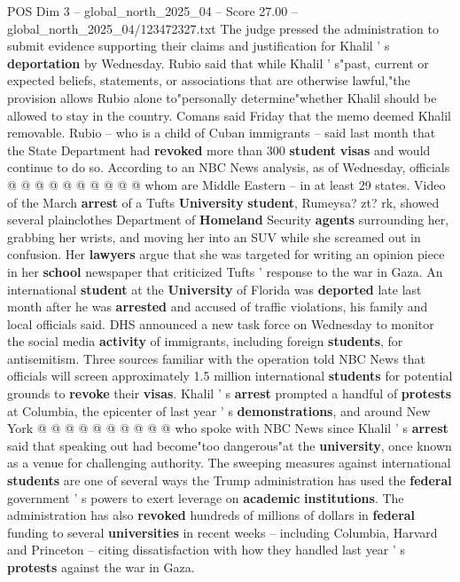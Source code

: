 \begin{textsample}{POS Dim 3 – global\_north\_2025\_04 – Score 27.00 – global\_north\_2025\_04/123472327.txt}
The judge pressed the administration to submit evidence supporting their claims and justification for Khalil ' s \textbf{deportation} by Wednesday.
Rubio said that while Khalil ' s"past, current or expected beliefs, statements, or associations that are otherwise lawful,"the provision allows Rubio alone to"personally determine"whether Khalil should be allowed to stay in the country.
Comans said Friday that the memo deemed Khalil removable.
Rubio -- who is a child of Cuban immigrants -- said last month that the State Department had \textbf{revoked} more than 300 \textbf{student} \textbf{visas} and would continue to do so.
According to an NBC News analysis, as of Wednesday, officials @ @ @ @ @ @ @ @ @ @ whom are Middle Eastern -- in at least 29 states.
Video of the March \textbf{arrest} of a Tufts \textbf{University} \textbf{student}, Rumeysa? zt? rk, showed several plainclothes Department of \textbf{Homeland} Security \textbf{agents} surrounding her, grabbing her wrists, and moving her into an SUV while she screamed out in confusion.
Her \textbf{lawyers} argue that she was targeted for writing an opinion piece in her \textbf{school} newspaper that criticized Tufts ' response to the war in Gaza.
An international \textbf{student} at the \textbf{University} of Florida was \textbf{deported} late last month after he was \textbf{arrested} and accused of traffic violations, his family and local officials said.
DHS announced a new task force on Wednesday to monitor the social media \textbf{activity} of immigrants, including foreign \textbf{students}, for antisemitism.
Three sources familiar with the operation told NBC News that officials will screen approximately 1.5 million international \textbf{students} for potential grounds to \textbf{revoke} their \textbf{visas}.
Khalil ' s \textbf{arrest} prompted a handful of \textbf{protests} at Columbia, the epicenter of last year ' s \textbf{demonstrations}, and around New York @ @ @ @ @ @ @ @ @ @ who spoke with NBC News since Khalil ' s \textbf{arrest} said that speaking out had become"too dangerous"at the \textbf{university}, once known as a venue for challenging authority.
The sweeping measures against international \textbf{students} are one of several ways the Trump administration has used the \textbf{federal} government ' s powers to exert leverage on \textbf{academic} \textbf{institutions}.
The administration has also \textbf{revoked} hundreds of millions of dollars in \textbf{federal} funding to several \textbf{universities} in recent weeks -- including Columbia, Harvard and Princeton -- citing dissatisfaction with how they handled last year ' s \textbf{protests} against the war in Gaza.

\end{textsample}
